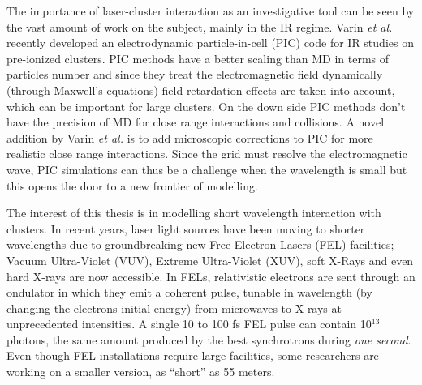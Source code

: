 The importance of laser-cluster interaction as an investigative tool
can be seen by the vast amount of work on the subject, mainly
in the IR regime\cite{Fennel2010}. Varin \textit{et al.}\cite{Varin2012}
recently developed an electrodynamic
particle-in-cell (PIC) code for IR studies on pre-ionized clusters. PIC methods
have a better scaling than MD in terms of particles number and since they treat
the electromagnetic field dynamically (through Maxwell's equations) field
retardation effects are taken into account, which can be important for large
clusters. On the down side PIC methods don't have the precision of MD for close
range interactions and collisions. A novel addition by Varin \textit{et al.}
is to add microscopic corrections to PIC for more realistic close range
interactions\cite{Peltz2012}.
Since the grid must resolve the electromagnetic wave,
PIC simulations can thus be a challenge when the wavelength is small
but this opens the door to a new frontier of modelling.



The interest of this thesis is in modelling short wavelength interaction with clusters.
In recent years, laser light sources
have been moving to shorter wavelengths due to
%
groundbreaking
%
new Free Electron Lasers (FEL)
facilities; Vacuum Ultra-Violet (VUV), Extreme Ultra-Violet (XUV), soft X-Rays
and even hard X-rays are now accessible. In FELs, relativistic electrons are sent
through an ondulator in which they emit a coherent pulse, tunable in wavelength
(by changing the electrons initial energy)
from microwaves to X-rays\cite{Brabec2009,Ackermann2007a,Pellegrini2012} at
unprecedented intensities. A single 10 to 100 fs FEL pulse can contain 10$^{13}$
photons, the same amount produced by the
best synchrotrons during
\textit{one second}\cite{Bostedt2009}. Even though FEL installations require
large facilities, some researchers are working on a smaller version, as
``short'' as 55 meters\cite{Shintake2008}.

